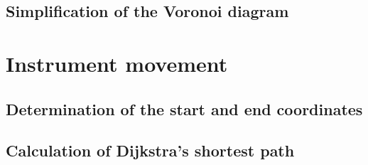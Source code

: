 \subsection{Simplification of the Voronoi diagram}







\section{Instrument movement}
\label{sec:exepath}


\subsection{Determination of the start and end coordinates}



\subsection{Calculation of Dijkstra's shortest path}
\label{sec:dijkstra}


